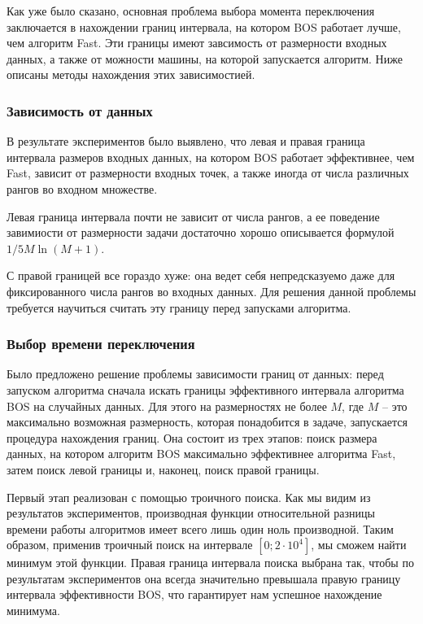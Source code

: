 Как уже было сказано, основная проблема выбора момента переключения заключается в нахождении границ интервала, на
котором BOS работает лучше, чем алгоритм Fast. Эти границы имеют завсимость от размерности входных данных, а также
от можности машины, на которой запускается алгоритм. Ниже описаны методы нахождения этих зависимостией.

\subsubsection{Зависимость от данных}

В результате экспериментов было выявлено, что левая и правая граница интервала размеров входных данных, на
котором BOS  работает эффективнее, чем Fast, зависит от размерности входных точек, а также иногда от числа различных
рангов во входном множестве.

Левая граница интервала почти не зависит от числа рангов, а ее поведение завимиости от размерности задачи достаточно
хорошо описывается формулой $1/5 M \ln (M + 1)$.

С правой границей все гораздо хуже: она ведет себя непредсказуемо даже для фиксированного числа рангов во входных
данных. Для решения данной проблемы требуется научиться считать эту границу перед запусками алгоритма.

\subsubsection{Выбор времени переключения}

Было предложено решение проблемы зависимости границ от данных: перед запуском алгоритма сначала искать границы
эффективного интервала алгоритма BOS на случайных данных. Для этого на размерностях не более $M$, где $M$ -- это
максимально возможная размерность, которая понадобится в задаче, запускается процедура нахождения границ. Она состоит
из трех этапов: поиск размера данных, на котором алгоритм BOS максимально эффективнее алгоритма Fast, затем поиск
левой границы и, наконец, поиск правой границы.

Первый этап реализован с помощью троичного поиска. Как мы видим из результатов экспериментов, производная функции
относительной разницы времени работы алгоритмов имеет всего лишь один ноль производной. Таким образом, применив
троичный поиск на интервале $[0; 2 \cdot 10^4]$, мы сможем найти минимум этой функции. Правая граница интервала поиска
выбрана так, чтобы по результатам экспериментов она всегда значительно превышала правую границу интервала
эффективности BOS, что гарантирует нам успешное нахождение минимума.

